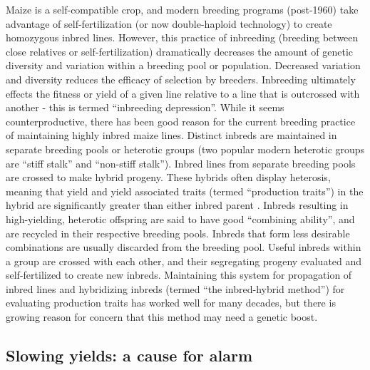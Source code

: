 \documentclass[12pt]{article}
\begin{document}
Maize is  a self-compatible crop, and modern breeding programs (post-1960) take advantage of self-fertilization (or now double-haploid technology) to create homozygous inbred lines. 
However, this practice of  inbreeding (breeding between close relatives or self-fertilization) dramatically decreases the amount of genetic diversity and variation \citep{Charlesworth:2001to} within a breeding pool or population.  
Decreased variation and diversity reduces the efficacy of selection by breeders. Inbreeding ultimately effects the fitness or yield of a given line relative to a line that is outcrossed with another - this is termed ``inbreeding depression''. While it seems counterproductive, there has been good reason for the current breeding practice of maintaining highly inbred maize lines. 
Distinct inbreds are maintained in separate breeding pools or heterotic groups (two popular modern heterotic groups are ``stiff stalk'' and ``non-stiff stalk'').
Inbred lines from separate breeding pools are crossed to make hybrid progeny.  
These hybrids often display heterosis, meaning that yield and yield associated traits (termed ``production traits'') in the hybrid are significantly greater than either inbred parent \citep{Springer:2007bj}.  
Inbreds resulting in high-yielding, heterotic offspring are said to have good ``combining ability'', and are recycled in their respective breeding pools.
Inbreds that form less desirable combinations are usually discarded from the breeding pool. 
Useful inbreds within a group are crossed with each other, and their segregating progeny evaluated and self-fertilized to create new inbreds. 
Maintaining this system for propagation of inbred lines and hybridizing inbreds (termed ``the inbred-hybrid method'') for evaluating production traits has worked well for many decades, but there is growing reason for concern that this method may need a genetic boost. 

\subsection*{Slowing yields: a cause for alarm} 
\end{document}
